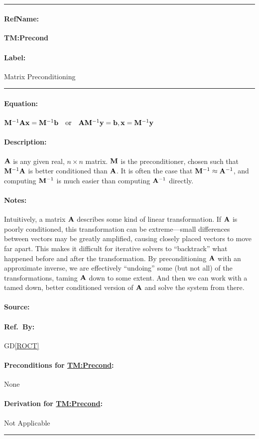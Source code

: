 \documentclass[12pt]{article}
\newcommand{\dref}[1]{GD\ref{#1}}
\newcommand{\deftheory}[9][Not Applicable]
{
\newpage
\noindent \rule{\textwidth}{0.5mm}

\paragraph{RefName: } \textbf{#2} \phantomsection
\label{#2}

\paragraph{Label:} #3

\noindent \rule{\textwidth}{0.5mm}

\paragraph{Equation:}

#4

\paragraph{Description:}

#5

\paragraph{Notes:}

#6

\paragraph{Source:}

#7

\paragraph{Ref.\ By:}

#8

\paragraph{Preconditions for \hyperref[#2]{#2}:}
\label{#2_precond}

#9

\paragraph{Derivation for \hyperref[#2]{#2}:}
\label{#2_deriv}

#1

\noindent \rule{\textwidth}{0.5mm}

}
\begin{document}
~\newline

\noindent
\deftheory
{TM:Precond}
{Matrix Preconditioning}
{ \(\mathbf{M}^{-1} \mathbf{A}\mathbf{x} = \mathbf{M}^{-1} \mathbf{b} \quad \text{or} \quad
  \mathbf{A}\mathbf{M}^{-1}\mathbf{y} = \mathbf{b} , \mathbf{x} = \mathbf{M}^{-1}\mathbf{y}\) }
{ \(\mathbf{A}\) is any given real, \(n \times n\) matrix. \(\mathbf{M}\) is the
  preconditioner, chosen such that \(\mathbf{M}^{-1}\mathbf{A}\) is better
  conditioned than \(\mathbf{A}\). It is often the case that \(\mathbf{M}^{-1}
  \approx \mathbf{A}^{-1}\), and computing \(\mathbf{M}^{-1}\) is much easier than
  computing \(\mathbf{A}^{-1}\) directly. }
{ Intuitively, a matrix \(\mathbf{A}\) describes some kind of linear
  transformation. If \(\mathbf{A}\) is poorly conditioned, this transformation can
  be extreme---small differences between vectors may be greatly amplified,
  causing closely placed vectors to move far apart. This makes it difficult for
  iterative solvers to ``backtrack'' what happened before and after the
  transformation. By preconditioning \(\mathbf{A}\) with an approximate inverse,
  we are effectively ``undoing'' some (but not all) of the transformations,
  taming \(\mathbf{A}\) down to some extent. And then we can work with a tamed
  down, better conditioned version of \(\mathbf{A}\) and solve the system from
  there. }
{\cite[p.~187]{ascher_first_2011}}
{\dref{ROCT}}
{None}
{}

~\newline
\end{document}
